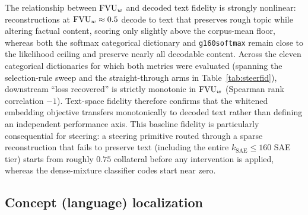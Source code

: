 The relationship between $\mathrm{FVU}_w$ and decoded text fidelity is strongly
nonlinear: reconstructions at $\mathrm{FVU}_w \approx 0.5$ decode to text that
preserves rough topic while altering factual content, scoring only
slightly above the corpus-mean floor, whereas both the softmax
categorical dictionary and \texttt{g160softmax} remain close to the
likelihood ceiling and preserve nearly all decodable content. Across the
eleven categorical dictionaries for which both metrics were evaluated
(spanning the selection-rule sweep and the straight-through arms in
Table~\ref{tab:steerfid}), downstream ``loss recovered'' is strictly
monotonic in $\mathrm{FVU}_w$ (Spearman rank correlation $-1$). Text-space fidelity
therefore confirms that the whitened embedding objective transfers
monotonically to decoded text rather than defining an independent
performance axis. This baseline fidelity is particularly consequential
for steering: a steering primitive routed through a sparse reconstruction
that fails to preserve text (including the entire
$k_{\mathrm{SAE}}{\leq}160$ SAE tier) starts from roughly $0.75$
collateral before any intervention is applied, whereas the dense-mixture
classifier codes start near zero.

\subsection{Concept (language) localization}
\label{sec:langlocal}

